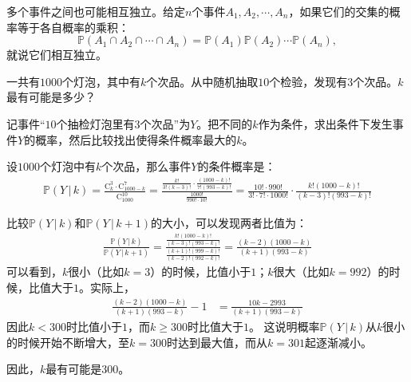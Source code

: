 \documentclass[12pt,UTF8]{ctexbook}
\begin{document}
多个事件之间也可能相互独立。给定$n$个事件$A_1, A_2, \cdots, A_n$，如果它们的交集的概率等于各自概率的乘积：
$$\mathbb{P}(A_1\cap A_2\cap \cdots \cap A_n) = \mathbb{P}(A_1) \mathbb{P}(A_2) \cdots \mathbb{P}(A_n),$$
就说它们相互独立。

\begin{et}
    一共有$1000$个灯泡，其中有$k$个次品。从中随机抽取$10$个检验，发现有$3$个次品。$k$最有可能是多少？
\end{et}

\begin{so}
    记事件“$10$个抽检灯泡里有$3$个次品”为$Y$。把不同的$k$作为条件，求出条件下发生事件$Y$的概率，然后比较找出使得条件概率最大的$k$。

    设$1000$个灯泡中有$k$个次品，那么事件$Y$的条件概率是：
    \begin{align*}
        \mathbb{P}(Y \,|\, k ) = \frac{\mathrm{C}_{k}^3 \cdot \mathrm{C}_{1000-k}^7}{\mathrm{C}_{1000}^{10}} = \frac{\frac{k!}{3!(k-3)!}\cdot \frac{(1000-k)!}{7!(993-k)!}}{\frac{1000!}{990!\cdot 10!}} = \frac{10!\cdot 990!}{3!\cdot 7!\cdot 1000!}\cdot \frac{k! (1000-k)!}{(k-3)!(993-k)!}
    \end{align*}

    比较$\mathbb{P}(Y \,|\, k )$和$\mathbb{P}(Y \,|\, k+1 )$的大小，可以发现两者比值为：
    \begin{align*}
        \frac{\mathbb{P}(Y \,|\, k )}{\mathbb{P}(Y \,|\, k + 1 )}= \frac{\frac{k! (1000-k)!}{(k-3)!(993-k)!}}{\frac{(k+1)! (999-k)!}{(k-2)!(992-k)!}} = \frac{(k - 2)(1000 - k)}{(k + 1)(993 - k)}
    \end{align*}
    可以看到，$k$很小（比如$k=3$）的时候，比值小于$1$；$k$很大（比如$k=992$）的时候，比值大于$1$。实际上，
    \begin{align*}
        \frac{(k - 2)(1000 - k)}{(k + 1)(993 - k)} - 1 &= \frac{10k -2993}{(k + 1)(993 - k)}
    \end{align*}
    因此$k<300$时比值小于$1$，而$k\geqslant 300$时比值大于$1$。
    这说明概率$\mathbb{P}(Y \,|\, k )$从$k$很小的时候开始不断增大，至$k=300$时达到最大值，而从$k=301$起逐渐减小。

    因此，$k$最有可能是$300$。
\end{so}
\end{document}
